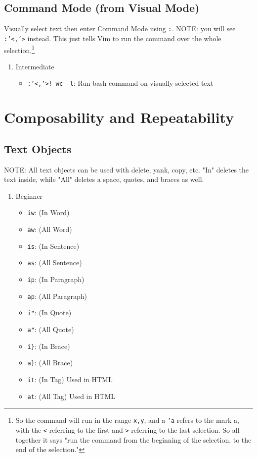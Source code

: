 \documentclass[11pt]{article}
\begin{document}
\subsection{Command Mode (from Visual Mode)}
\label{sec:orgf2097e9}
Visually select text then enter Command Mode using \texttt{:}. NOTE: you will see
\texttt{:'<,'>} instead. This just tells Vim to run the command over the whole
selection.\footnote{So the command will run in the range \texttt{x,y}, and 
a \texttt{'a} refers to the mark a, with the \texttt{<} referring to the first and \texttt{>}
referring to the last selection. So all together it says "run the command from
the beginning of the selection, to the end of the selection."}
\begin{enumerate}
\item Intermediate
\label{sec:org3befbcb}
\begin{itemize}
\item \texttt{:'<,'>! wc -l}: Run bash command on visually selected text
\end{itemize}
\end{enumerate}
\section{Composability and Repeatability}
\label{sec:org90c8593}
\subsection{Text Objects}
\label{sec:org6d9ea9b}
NOTE: All text objects can be used with delete, yank, copy, etc. "In" deletes
the text inside, while "All" deletes a space, quotes, and braces as well.
\begin{enumerate}
\item Beginner
\label{sec:orgd02c2cf}
\begin{itemize}
\item \texttt{iw}: (In Word)
\item \texttt{aw}: (All Word)
\item \texttt{is}: (In Sentence)
\item \texttt{as}: (All Sentence)
\item \texttt{ip}: (In Paragraph)
\item \texttt{ap}: (All Paragraph)
\item \texttt{i"}: (In Quote)
\item \texttt{a"}: (All Quote)
\item \texttt{i\}}: (In Brace)
\item \texttt{a\}}: (All Brace)
\item \texttt{it}: (In Tag) Used in HTML
\item \texttt{at}: (All Tag) Used in HTML
\end{itemize}
\end{enumerate}
\end{document}
